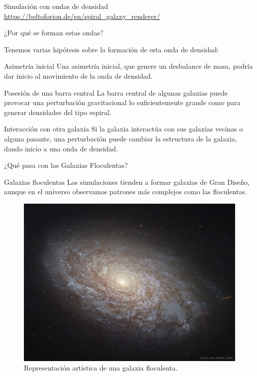 \documentclass{beamer}
\begin{document}
\begin{frame}{Simulación con ondas de densidad}
\url{https://beltoforion.de/en/spiral_galaxy_renderer/}
\end{frame}
\begin{frame}{¿Por qué se forman estas ondas?}

Tenemos varias hipótesis sobre la formación de esta onda de densidad:

\begin{block}{Asimetría inicial}
Una asimetría inicial, que genere un desbalance de masa, podría dar inicio al movimiento de la onda de densidad.
\end{block}
\begin{block}{Posesión de una barra central}
La barra central de algunas galaxias puede provocar una perturbación gravitacional lo suficientemente grande como para generar densidades del tipo espiral.
\end{block}
\begin{block}{Interacción con otra galaxia}
Si la galaxia interactúa con sus galaxias vecinas o alguna pasante, una perturbación puede cambiar la estructura de la galaxia, dando inicio a una onda de densidad. %
\end{block}

\end{frame}
\begin{frame}{¿Qué pasa con las Galaxias Floculentas?}

\begin{alertblock}{Galaxias floculentas}
Las simulaciones tienden a formar galaxias de Gran Diseño, aunque en el universo observamos patrones más complejos como las floculentas.
\end{alertblock}

\begin{figure}[h!]
\begin{center}
\includegraphics[scale=0.08]{floculenta.jpg}
\caption{Representación artística de una galaxia floculenta.}
\end{center}
\end{figure}
\end{frame}
\end{document}
